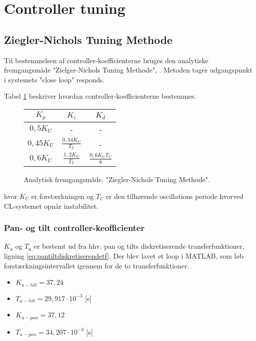 \section{Controller tuning}
\label{sec:PID}





\subsection{Ziegler-Nichols Tuning Methode}
Til bestemmelsen af controller-koefficienterne bruges den analytiske fremgangsmåde "Zielger-Nichols Tuning Methode", \citep[Kap. 7.6]{reg_modern_control_systems}. 
Metoden tager udgangspunkt i systemets "close loop" responds. 


Tabel \ref{tb:ZieglerNichols} beskriver hvordan controller-koefficienterne bestemmes.

\begin{figure}[th!]
\centering
\begin{tabular}{c|c|c}
\(K_p\) & \(K_i\) & \(K_d\)\\\hline
\(0,5  { K }_{ U }\) &-&-\\
\(0,45  { K }_{ U }\) & \( \frac { 0,54  { K }_{ U } }{ { T }_{ U } }  \) &-\\
\(0,6  { K }_{ U } \) &  \( \frac { 1,2  { K }_{ U } }{ { T }_{ U } }  \) & \(\frac { 0,6  { K }_{ U }  { T }_{ U } }{ 8 }  \)
\end{tabular}
\captionsetup{type=table}
\caption[Ziegler-Nichols Tuning Methode]{Analytisk fremgangsmåde. "Ziegler-Nichols Tuning Methode".}
\label{tb:ZieglerNichols}
\end{figure}

hvor \(K_U\) er forstærkningen og \(T_U\) er den tilhørende oscillations periode hvorved CL-systemet opnår instabilitet.

\subsubsection{Pan- og tilt controller-keofficienter}
\(K_u\) og \(T_u\) er bestemt ud fra hhv. pan og tilts diskretiserende transferfunktioner, ligning \ref{eq:pantiltdiskretiserendetf}. Der blev lavet et loop i MATLAB, som løb forstærkningsintervallet igennem for de to transferfunktioner.
\begin{itemize}
\itemsep1pt
\item \(K_{u-tilt} = 37,24\)
\item \(T_{u-tilt} = 29,917 \cdot 10^{-3}\) [s] 
\item \(K_{u-pan} = 37,12\)
\item \(T_{u-pan} = 34,207\cdot 10^{-3}\) [s] 
\end{itemize}

